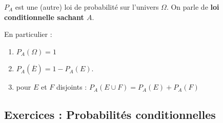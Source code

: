 \documentclass[main.tex]{subfiles}
\begin{document}
\begin{theorem} $P_A$ est une (autre) loi de probabilité sur l'univers $\Omega$.  On parle de \textbf{loi conditionnelle sachant $A$}.
	
	\noindent En particulier :
	\begin{enumerate}[label=\textbullet]
		\item $P_A(\Omega)=1$
		\item $P_A(\overline{E})=1-P_A(E)$.
		\item pour $E$ et $F$ disjoints : $P_A(E\cup F)=P_A(E)+P_A(F)$
	\end{enumerate}  
\end{theorem}  


\newpage 
{}  
\pagestyle{scrheadings} %
\onehalfspacing
\subsection{Exercices : Probabilités conditionnelles}
\end{document}
